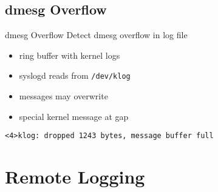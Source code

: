\documentclass[14pt]{beamer}
\begin{document}
\subsection{dmesg Overflow}
\begin{frame}{dmesg Overflow}
    Detect dmesg overflow in log file
\begin{itemize}
    \item ring buffer with kernel logs
    \item syslogd reads from \texttt{/dev/klog}
    \item messages may overwrite
    \item special kernel message at gap
\end{itemize}
    \vspace{.5cm}
    \texttt{<4>klog:\ dropped 1243 bytes, message buffer full}
\end{frame}

\section{Remote Logging}
\end{document}
